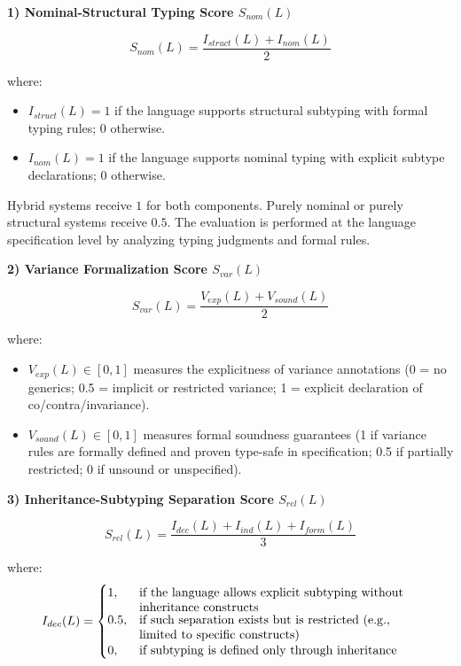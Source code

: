 \textbf{1) Nominal-Structural Typing Score $S_{nom}(L)$}

\[
S_{nom}(L) = \frac{I_{struct}(L) + I_{nom}(L)}{2}
\]

where:

\begin{itemize}
\item $I_{struct}(L) = 1$ if the language supports structural subtyping with formal typing rules; $0$ otherwise.
\item $I_{nom}(L) = 1$ if the language supports nominal typing with explicit subtype declarations; $0$ otherwise.
\end{itemize}

Hybrid systems receive $1$ for both components. Purely nominal or purely structural systems receive $0.5$. The evaluation is performed at the language specification level by analyzing typing judgments and formal rules.

\textbf{2) Variance Formalization Score $S_{var}(L)$}

\[
S_{var}(L) = \frac{V_{exp}(L) + V_{sound}(L)}{2}
\]

where:

\begin{itemize}
\item $V_{exp}(L) \in [0,1]$ measures the explicitness of variance annotations (0 = no generics; 0.5 = implicit or restricted variance; 1 = explicit declaration of co/contra/invariance).
\item $V_{sound}(L) \in [0,1]$ measures formal soundness guarantees (1 if variance rules are formally defined and proven type-safe in specification; 0.5 if partially restricted; 0 if unsound or unspecified).
\end{itemize}

\textbf{3) Inheritance-Subtyping Separation Score $S_{rel}(L)$}

\[
S_{rel}(L) = \frac{I_{dec}(L) + I_{ind}(L) + I_{form}(L)}{3}
\]

where:
\[
    I_{dec}(L) =
    \begin{cases}
        1, & \text{\parbox[t]{0.65\linewidth}{\raggedright
            if the language allows explicit subtyping without inheritance constructs%
        }} \\
        0.5, & \text{\parbox[t]{0.65\linewidth}{\raggedright
            if such separation exists but is restricted (e.g., limited to specific constructs)%
         }} \\
        0, & \text{\parbox[t]{0.65\linewidth}{\raggedright
            if subtyping is defined only through inheritance%
         }}
    \end{cases}
\]


